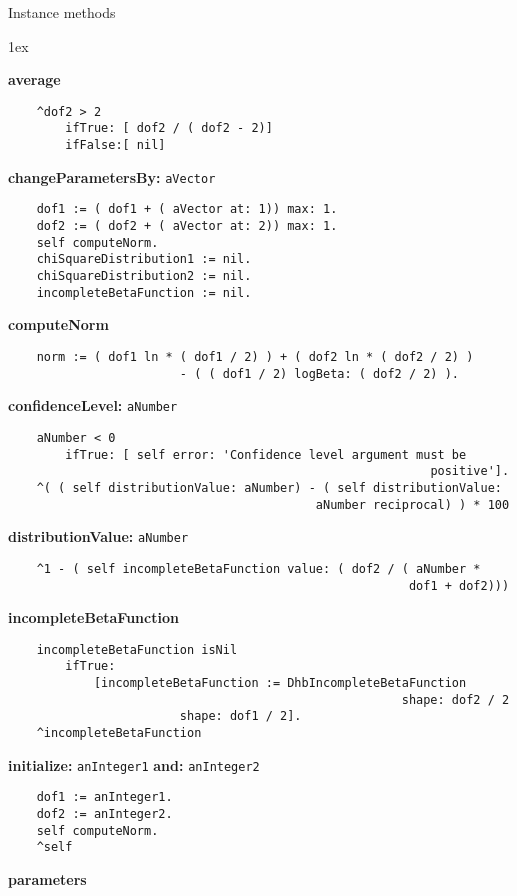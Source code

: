 Instance methods
{\parskip 1ex\par\noindent}
{\bf average}
\begin{verbatim}
    ^dof2 > 2
        ifTrue: [ dof2 / ( dof2 - 2)]
        ifFalse:[ nil]

\end{verbatim}
{\bf changeParametersBy:} {\tt aVector}
\begin{verbatim}
    dof1 := ( dof1 + ( aVector at: 1)) max: 1.
    dof2 := ( dof2 + ( aVector at: 2)) max: 1.
    self computeNorm.
    chiSquareDistribution1 := nil.
    chiSquareDistribution2 := nil.
    incompleteBetaFunction := nil.

\end{verbatim}
{\bf computeNorm}
\begin{verbatim}
    norm := ( dof1 ln * ( dof1 / 2) ) + ( dof2 ln * ( dof2 / 2) )
                        - ( ( dof1 / 2) logBeta: ( dof2 / 2) ).

\end{verbatim}
{\bf confidenceLevel:} {\tt aNumber}
\begin{verbatim}
    aNumber < 0
        ifTrue: [ self error: 'Confidence level argument must be 
                                                           positive'].
    ^( ( self distributionValue: aNumber) - ( self distributionValue: 
                                           aNumber reciprocal) ) * 100

\end{verbatim}
{\bf distributionValue:} {\tt aNumber}
\begin{verbatim}
    ^1 - ( self incompleteBetaFunction value: ( dof2 / ( aNumber * 
                                                        dof1 + dof2)))

\end{verbatim}
{\bf incompleteBetaFunction}
\begin{verbatim}
    incompleteBetaFunction isNil 
        ifTrue: 
            [incompleteBetaFunction := DhbIncompleteBetaFunction 
                                                       shape: dof2 / 2
                        shape: dof1 / 2].
    ^incompleteBetaFunction

\end{verbatim}
{\bf initialize:} {\tt anInteger1} {\bf and:} {\tt anInteger2}
\begin{verbatim}
    dof1 := anInteger1.
    dof2 := anInteger2.
    self computeNorm.
    ^self

\end{verbatim}
{\bf parameters}
